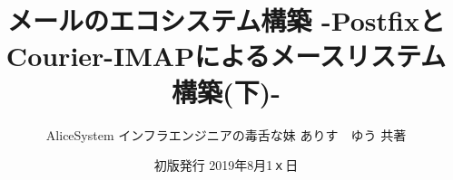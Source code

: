 \title{メールのエコシステム構築 -PostfixとCourier-IMAPによるメースリステム構築(下)-}
\author{AliceSystem インフラエンジニアの毒舌な妹 ありす　ゆう 共著}
\date{初版発行 2019年8月1ｘ日}